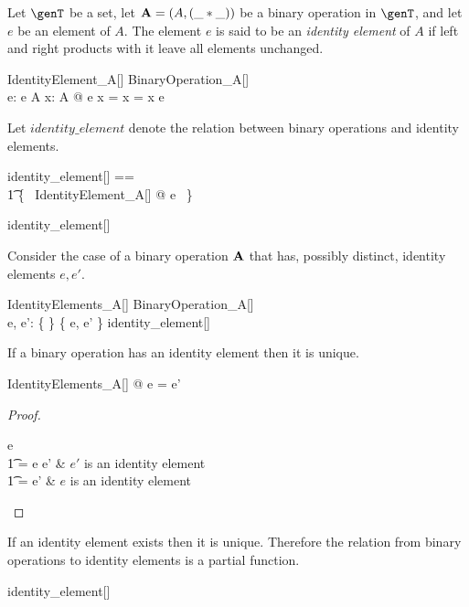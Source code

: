 \documentclass{amsart}
\begin{document}
Let $\genT$ be a set, let $\mathbf{A} = (A, (\_ \mathbin{*} \_))$ be a binary operation in $\genT$, and let $e$ be an element of $A$.
The element $e$ is said to be an \textit{identity element} of $A$ if left and right 
products with it leave all elements unchanged.
\begin{schema}{IdentityElement\_A}[\genT]
	BinaryOperation\_A[\genT] \\
	e: \genT
\where
	e \in A
\also
	\forall x: A @ e \mulA x = x = x \mulA e
\end{schema}

Let $identity\_element$ denote the relation between binary operations and identity elements.
\begin{zed}
	identity\_element[\genT] == \\
	\t1	\{~ IdentityElement\_A[\genT] @ \strucA \mapsto e ~\}
\end{zed}

\begin{remark}
\begin{zed}
	identity\_element[\setT] \in \binop \setT \rel \setT
\end{zed}
\end{remark}

Consider the case of a binary operation $\mathbf{A}$ that has, possibly distinct, identity elements $e, e'$.
\begin{schema}{IdentityElements\_A}[\genT]
	BinaryOperation\_A[\genT] \\
	e, e': \genT
\where
	\{ \strucA \} \cross \{ e, e' \} \subseteq identity\_element[\genT]
\end{schema}

\begin{remark}
If a binary operation has an identity element then it is unique.

\begin{zed}
	\forall IdentityElements\_A[\setT] @ e = e'
\end{zed}

\begin{proof}
\begin{argue}
e \\
\t1	= e \mulA e'	& $e'$ is an identity element \\
\t1	= e'			& $e$ is an identity element
\end{argue}
\end{proof}

\end{remark}

\begin{remark}
If an identity element exists then it is unique.
Therefore the relation from binary operations to identity elements is a partial function.

\begin{zed}
identity\_element[\setT] \in \binop \setT \pfun \setT
\end{zed}

\end{remark}
\end{document}

